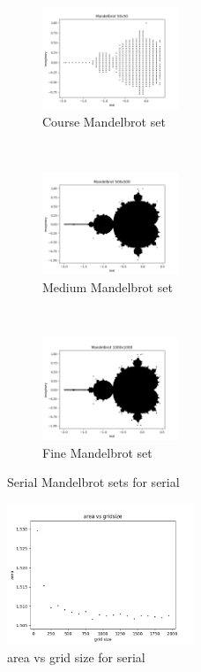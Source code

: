 \documentclass[12pt]{article}
\theoremstyle{plain}
\theoremstyle{definition}
\begin{document}
\begin{figure}[t!]
    \centering
    \begin{subfigure}[t]{0.5\textwidth}
        \centering
        \includegraphics[height=1.2in]{mandelbrot_course_a.png}
        \caption{Course Mandelbrot set}
    \end{subfigure}%
    ~
    \begin{subfigure}[t]{0.5\textwidth}
        \centering
        \includegraphics[height=1.2in]{mandelbrot_medium_a.png}
        \caption{Medium Mandelbrot set}
    \end{subfigure}
    ~
        \begin{subfigure}[t]{0.5\textwidth}
        \centering
        \includegraphics[height=1.2in]{mandelbrot_fine_a.png}
        \caption{Fine Mandelbrot set}
    \end{subfigure}%
    \caption{Serial Mandelbrot sets for serial}
\end{figure}
\begin{figure}
 \centering
        \includegraphics[width=0.5\textwidth]{area_a.png}
        \caption{area vs grid size for serial }
\end{figure}
\end{document}
